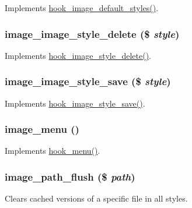 \label{image_8module_ac412aad2549572b4f2dae20d2dbd89ae}
Implements \hyperlink{group__hooks_ga856096251574b0df42813f6aff0d62ab}{hook\_\-image\_\-default\_\-styles()}. \hypertarget{image_8module_a919467cd4f77608c63a9ada825782c66}{
\subsubsection[{image\_\-image\_\-style\_\-delete}]{\setlength{\rightskip}{0pt plus 5cm}image\_\-image\_\-style\_\-delete (\$ {\em style})}}
\label{image_8module_a919467cd4f77608c63a9ada825782c66}
Implements \hyperlink{group__hooks_ga376a3d4a9427d6a8dad73d68bdd140dc}{hook\_\-image\_\-style\_\-delete()}. \hypertarget{image_8module_afe509faa7e910702e9f9e685b7caee54}{
\subsubsection[{image\_\-image\_\-style\_\-save}]{\setlength{\rightskip}{0pt plus 5cm}image\_\-image\_\-style\_\-save (\$ {\em style})}}
\label{image_8module_afe509faa7e910702e9f9e685b7caee54}
Implements \hyperlink{group__hooks_gad403dde0a7859e160772ae696ab35cea}{hook\_\-image\_\-style\_\-save()}. \hypertarget{image_8module_a6307beafb83fb2959c3db239516a9515}{
\subsubsection[{image\_\-menu}]{\setlength{\rightskip}{0pt plus 5cm}image\_\-menu ()}}
\label{image_8module_a6307beafb83fb2959c3db239516a9515}
Implements \hyperlink{group__hooks_ga5c95244fea59b25666e409759e133ded}{hook\_\-menu()}. \hypertarget{image_8module_a842cc641e4d7c7f1e403d400e92ec2ce}{
\subsubsection[{image\_\-path\_\-flush}]{\setlength{\rightskip}{0pt plus 5cm}image\_\-path\_\-flush (\$ {\em path})}}
\label{image_8module_a842cc641e4d7c7f1e403d400e92ec2ce}
Clears cached versions of a specific file in all styles.



